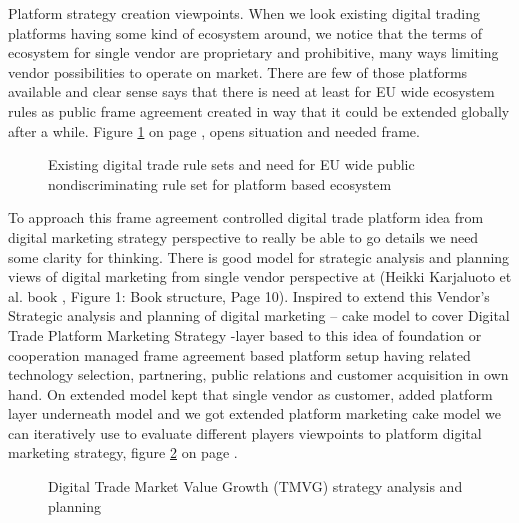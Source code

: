 Platform strategy creation viewpoints.
When we look ex\-ist\-ing digital trading platforms having some kind of
ecosystem around, we notice that the terms of ecosystem for single vendor are
proprietary and prohibitive, many ways limiting vendor possibilities to
operate on market. There are few of those platforms available and clear sense
says that there is need at least for EU wide ecosystem rules as public frame
agreement created in way that it could be extended globally after a while.
Figure \ref{fig:TermSets} on page \pageref{fig:TermSets}, opens situation and
needed frame.

\begin{figure} %
 \begin{center}
  \caption{Existing digital trade rule sets and need for EU wide public
	 nondiscriminating rule set for platform based ecosystem}
  \label{fig:TermSets}
 \end{center}
\end{figure}

To approach this frame agreement controlled digital trade platform idea from
digital marketing strategy perspective to really be able to go details we need
some clarity for thinking. There is good model for strategic analysis and
planning views of digital marketing from single vendor perspective at (Heikki
Karjaluoto et al. book \cite{Karjaluoto2022}, Figure 1: Book structure, Page
10). Inspired to extend this Vendor's Strategic analysis and planning of
digital marketing -- cake model to cover Digital Trade Platform Marketing
Strategy -layer based to this idea of foundation or cooperation managed frame
agreement based platform setup having related technology selection,
partnering, public relations and customer acquisition in own hand. On extended
model kept that single vendor as customer, added platform layer underneath
model and we got extended platform marketing cake model we can iteratively use
to evaluate different players viewpoints to platform digital marketing
strategy, figure \ref{fig:TradeMarketValueGrowth} on page
\pageref{fig:TradeMarketValueGrowth}.

\begin{figure} %
 \begin{center}
  \caption{Digital Trade Market Value Growth (TMVG)
	 strategy analysis and planning}
  \label{fig:TradeMarketValueGrowth}
 \end{center}
\end{figure}

